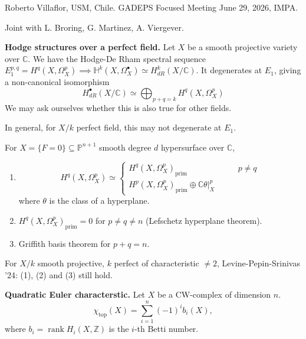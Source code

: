 \noindent
Roberto Villaflor, USM, Chile.
GADEPS Focused Meeting June 29, 2026, IMPA.

\medskip\noindent
Joint with L. Broring, G. Martinez,
A. Viergever.

\medskip\noindent
{\bf Hodge structures over a perfect
field.} Let $X$ be a smooth
projective variety over $\mathbb{C}$.
We have the Hodge-De Rham spectral sequence
$E^{p,q}_1=H^q(X,\Omega_X^p) 
\implies \mathbb{H}^k(X,\Omega_X^\bullet)
\simeq H^k_{dR}(X/\mathbb{C})$.
It degenerates at $E_1$, giving
a non-canonical isomorphism
$$
H^\bullet_{dR}(X/\mathbb{C})
\simeq
\bigoplus_{p+q=k}H^q(X,\Omega_X^p)
$$
We may ask ourselves whether this is also
true for other fields.

\begin{remark}
\label{remark-derham-to-hodge-not-degenerate}
In general, for $X/k$ perfect field,
this may not degenerate at $E_1$.
\end{remark}

\noindent
For $X = \{F=0\} \subseteq \mathbb{P}^{n+1}$
smooth degree $d$ hypersurface over
$\mathbb{C}$,
\begin{enumerate}
\item 
$$
H^q(X,\Omega_X^p)
\simeq \begin{cases}
H^q(X,\Omega_X^p)_{\operatorname{prim}}\qquad
&p \neq q \\
H^p(X,\Omega_X^p)_{\operatorname{prim}}\oplus
\mathbb{C}\theta |_X^p\qquad &
\end{cases}
$$
where $\theta$ is the class of a hyperplane.

\item
$H^q(X,\Omega_X^p)_{\operatorname{prim}}=0$
for $p \neq q \neq  n$ 
(Lefschetz hyperplane theorem).

\item Griffith basis theorem for $p+q=n$.
\end{enumerate}

\begin{remark}
\label{remark-lps}
For $X/k$ smooth projective, $k$ perfect
of characteristic $\neq 2$,
Levine-Pepin-Srinivas '24: (1), (2)
and (3) still hold.
\end{remark}

\medskip\noindent
{\bf Quadratic Euler characterstic.} 
Let $X$ be a CW-complex of dimension $n$.
$$
\chi_{\operatorname{top}}(X)
=\sum_{i=1}^n(-1)^i b_i(X),
$$
where
$b_i=\operatorname{rank}H_i(X,\mathbb{Z})$
is the $i$-th Betti number.

